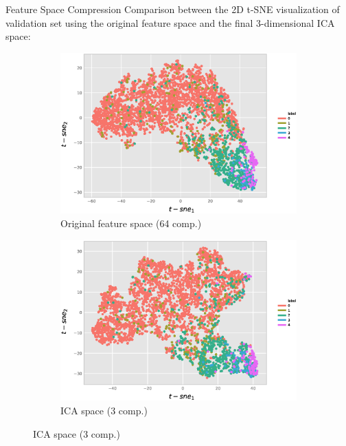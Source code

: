 \documentclass{beamer}
\begin{document}
\begin{frame}{Feature Space Compression}{}
\alert{Comparison between the 2D t-SNE visualization of validation set using the original feature space and the final 3-dimensional ICA space:}
\begin{figure}[h]
	\centering
	\begin{subfigure}[b]{0.49\textwidth}
		\centering
		\includegraphics[width=\textwidth]{./chapter_ica/tsne2d_p75.eps}
		\caption{Original feature space (64 comp.)}	
	\end{subfigure}
	\begin{subfigure}[b]{0.49\textwidth}
		\centering
		\includegraphics[width=\textwidth]{./chapter_ica/tsne2d_ica_p75.eps}
		\caption{ICA space (3 comp.)}
	\end{subfigure}	
	\label{fig:tsne} 
\end{figure}
\end{frame}
\end{document}
